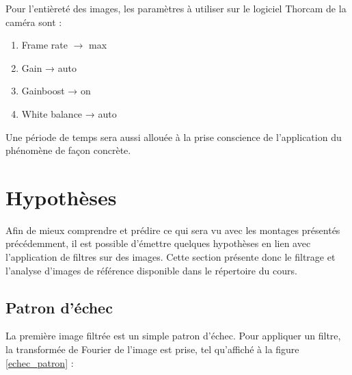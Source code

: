 \documentclass[11pt,letterpaper]{article}
\begin{document}
\begin{table}[h!]
\centering
{}
\caption{Tableau des paramètres utilisés pour la prise des 10 images}
\label{10images}
\end{table}

Pour l'entièreté des images, les paramètres à utiliser sur le logiciel Thorcam de la caméra sont : 

\begin{enumerate}
    \item Frame rate $\rightarrow$ max\\
    \item Gain → auto \\
    \item Gainboost → on\\
    \item White balance → auto
\end{enumerate}

Une période de temps sera aussi allouée à la prise conscience de l'application du phénomène de façon concrète. 

\section{Hypothèses}

Afin de mieux comprendre et prédire ce qui sera vu avec les montages présentés précédemment, il est possible d'émettre quelques hypothèses en lien avec l'application de filtres sur des images. Cette section présente donc le filtrage et l'analyse d'images de référence disponible dans le répertoire du cours.

\subsection{Patron d'échec}

La première image filtrée est un simple patron d'échec. Pour appliquer un filtre, la transformée de Fourier de l'image est prise, tel qu'affiché à la figure \ref{echec_patron} :
\end{document}
